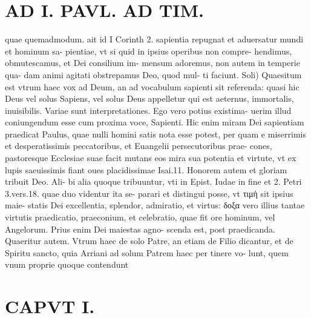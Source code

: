 \documentclass{article}
\begin{document}
\begin{pages}
\section*{AD I. PAVL. AD TIM. }
\marginpar{[ p.32 ]}\pstart quae quemadmodum. ait id I Corinth 2. sapientia repugnat et aduersatur mundi et hominum sa- pientiae, vt si quid in ipsius operibus non compre- hendimus, obmutescamus, et Dei consilium im- mensum adoremus, non autem in temperie qua- dam animi agitati obstrepamus Deo, quod mul- ti faciunt. Soli) Quaesitum est vtrum haec vox ad Deum, an ad vocabulum sapienti sit referenda: quasi hic Deus vel solus Sapiens, vel solus Deus appelletur qui est aeternus, immortalis, inuisibilis. Variae sunt interpretationes. Ego vero potius existima- uerim illud coniungendum esse cum proxima voce, Sapienti. Hic enim miram Dei sapientiam praedicat Paulus, quae nulli homini satis nota esse potest, per quam e miserrimis et desperatissimis peccatoribus, et Euangelii persecutoribus prae- cones, pastoresque Ecclesiae suae facit mutans eos mira sua potentia et virtute, vt ex lupis saeuissimis fiant oues placidissimae Isai.11. Honorem autem et gloriam tribuit Deo. Ali- bi alia quoque tribuuntur, vti in Epist. Iudae in fine et 2. Petri 3.vers.18. quae duo videntur ita se- parari et distingui posse, vt τιμὴ sit ipsius maie- statis Dei excellentia, splendor, admiratio, et virtus: δοξα vero illius tantae virtutis praedicatio, praeconium, et celebratio, quae fit ore hominum, vel Angelorum. Prius enim Dei maiestas agno- scenda est, post praedicanda. Quaeritur autem. Vtrum haec de solo Patre, an etiam de Filio dicantur, et de Spiritu sancto, quia Arriani ad solum Patrem haec per tinere vo- lunt, quem vnum proprie quoque contendunt  \pend
\section*{CAPVT  I. }
\marginpar{[ p.33 ]}\pstart {}
{}

\end{pages}
\end{document}
